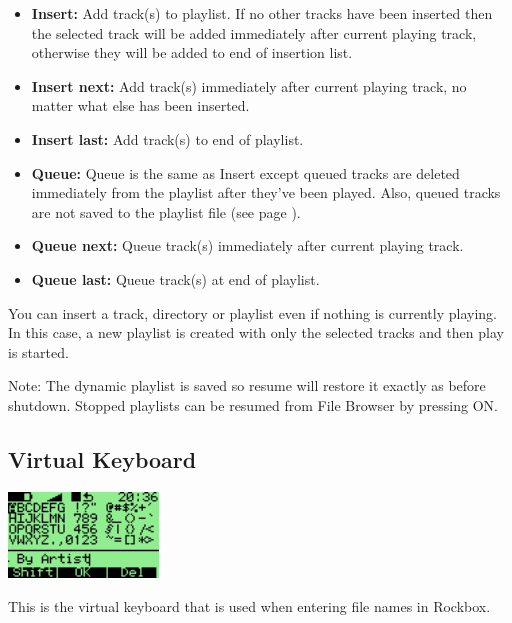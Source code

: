 \begin{itemize}
\item \textbf{Insert:} Add track(s) to playlist. If no other tracks have been inserted then the selected track will be added immediately after current playing track, otherwise they will be added to end of insertion list.
\item \textbf{Insert next: }Add track(s) immediately after current playing
track, no matter what else has been inserted.
\item \textbf{Insert last: }Add track(s) to end of playlist.
\item \textbf{Queue: } Queue is the same as Insert except queued tracks are deleted immediately from the playlist after they've been played. Also, queued tracks are not saved to the playlist file (see page \pageref{ref:playlistoptions}).
\item \textbf{Queue next:} Queue track(s) immediately after current playing track.
\item \textbf{Queue last: }Queue track(s) at end of playlist.
\end{itemize}

You can insert a track, directory or playlist even if nothing is
currently playing. In this case, a new playlist is created with only
the selected tracks and then play is started.

Note: The dynamic playlist is saved so resume will restore it exactly as
before shutdown. Stopped playlists can be resumed from File Browser by
pressing ON.




\subsection{Virtual Keyboard}
\begin{center}
  \includegraphics[width=4cm]{rockbox_interface/images/ss-virtual-keyboard-112x64x1.png}
\end{center}
This is the virtual keyboard that is used when entering file names in Rockbox.

